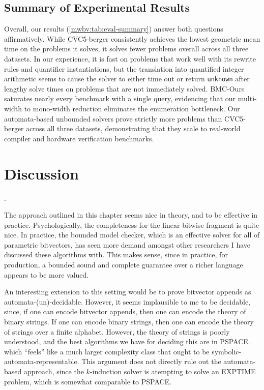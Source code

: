 \subsection{Summary of Experimental Results}

Overall, our results (\cref{mwbv:tab:eval-summary}) answer both questions affirmatively.
While CVC5-berger consistently achieves the lowest geometric mean time on the problems it solves,
it solves fewer problems overall across all three datasets.
In our experience, it is fast on problems that work well with its rewrite rules and quantifier instantiations,
but the translation into quantified integer arithmetic seems to cause the solver to either time out or return \texttt{unknown} after lengthy solve times
on problems that are not immediately solved.
BMC-Ours saturates nearly every benchmark with a single \qfbv{} query,
evidencing that our multi-width to mono-width reduction eliminates the enumeration bottleneck.
Our automata-based unbounded solvers prove strictly more problems than CVC5-berger across all three datasets,
demonstrating that they scale to real-world compiler and hardware verification benchmarks.


\section{Discussion}
.
\label{sec:multi:related}

The approach outlined in this chapter seems nice in theory, and to be effective in practice.
Psychologically, the completeness for the linear-bitwise fragment is quite nice.
In practice, the bounded model checker, which is an effective solver for all of parametric bitvectors,
has seen more demand amongst other researchers I have discussed these algorithms with.
This makes sense, since in practice, for production, a bounded sound and complete guarantee over a richer language appears to be more valued.

An interesting extension to this setting would be to prove bitvector appends as automata-(un)-decidable.
However, it seems implausible to me to be decidable, since, if one can encode bitvector appends, then one can encode the theory of binary strings.
If one can encode binary strings, then one can encode the theory of strings over a finite alphabet.
However, the theory of strings is poorly understood, and the best algorithms we have for deciding this are in PSPACE.
which ``feels'' like a much larger complexity class that ought to be symbolic-automata-representable.
This argument does not directly rule out the automata-based approach, since the $k$-induction solver is atempting to solve an EXPTIME problem,
which is somewhat comparable to PSPACE.

